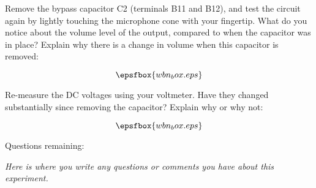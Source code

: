 Remove the bypass capacitor C2 (terminals B11 and B12), and test the circuit again by lightly touching the microphone cone with your fingertip.  What do you notice about the volume level of the output, compared to when the capacitor was in place?  Explain why there is a change in volume when this capacitor is removed:

$$\epsfbox{wbn_box.eps}$$

Re-measure the DC voltages using your voltmeter.  Have they changed substantially since removing the capacitor?  Explain why or why not:

$$\epsfbox{wbn_box.eps}$$


\vskip 10pt

\goodbreak

\noindent Questions remaining:

{\it Here is where you write any questions or comments you have about this experiment.}

\vskip 50pt

















